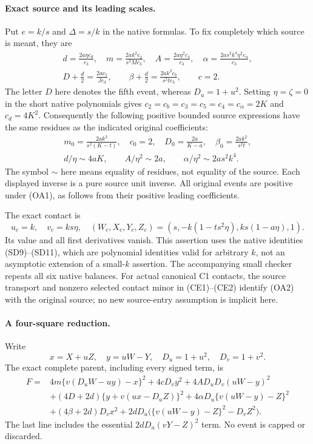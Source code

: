 \paragraph{Exact source and its leading scales.}
Put $e=k/s$ and $\Delta=s/k$ in the native formulas. To fix completely
which source is meant, they are
\[
\begin{gathered}
 d=\frac{2a\eta c_d}{c_3},\quad
 m=\frac{2ak^2c_2}{s^2Mc_3},\quad
 A=\frac{2a\eta^2c_4}{c_3},\quad
 \alpha=\frac{2as^2k^4\eta^2c_\alpha}{c_3},\\
 D+\frac d2=\frac{2ac_5}{Jc_3},\qquad
 \beta+\frac d2=\frac{2ak^2c_b}{s^2tc_3},\qquad c=2.
\end{gathered}
\tag{OA2}
\]
The letter $D$ here denotes the fifth event, whereas $D_u=1+u^2$.
Setting $\eta=\zeta=0$ in the short native polynomials gives
$c_2=c_b=c_3=c_5=c_4=c_\alpha=2K$ and $c_d=4K^2$.
Consequently the following positive bounded source expressions have
the same residues as the indicated original coefficients:
\[
\begin{gathered}
 m_0=\frac{2ak^2}{s^2(K-t)},\quad
 c_0=2,\quad D_0=\frac{2a}{K-a},\quad
 \beta_0=\frac{2ak^2}{s^2t},\\
 d/\eta\sim4aK,\qquad A/\eta^2\sim2a,\qquad
 \alpha/\eta^2\sim2as^2k^4.                         
\end{gathered}
\tag{OA3}
\]
The symbol $\sim$ here means equality of residues, not equality of
the source. Each displayed inverse is a pure source unit inverse.
All original events are positive under (OA1), as follows from their
positive leading coefficients.

The exact contact is
\[
 u_c=k,\quad v_c=ks\eta,\quad
 (W_c,X_c,Y_c,Z_c)=(s,-k(1-ts^2\eta),ks(1-a\eta),1).
                                                        \tag{OA4}
\]
Its value and all first derivatives vanish. This assertion uses the
native identities (SD9)--(SD11), which are polynomial identities valid
for arbitrary $k$, not an asymptotic extension of a small-$k$ assertion.
The accompanying small checker repeats all six native balances.
For actual canonical C1 contacts, the source transport and nonzero
selected contact minor in (CE1)--(CE2) identify (OA2) with the original
source; no new source-entry assumption is implicit here.

\paragraph{A four-square reduction.}
Write
\[
 x=X+uZ,\quad y=uW-Y,\quad D_u=1+u^2,\quad D_v=1+v^2.
\]
The exact complete parent, including every signed term, is
\begin{align*}
 F={}&4m\{v(D_uW-uy)-x\}^2+4cD_vy^2
       +4AD_uD_v(uW-y)^2\\
 &+(4D+2d)\{y+v(ux-D_uZ)\}^2
       +4\alpha D_u\{v(uW-y)-Z\}^2\\
 &+(4\beta+2d)D_vx^2
       +2dD_u\bigl(\{v(uW-y)-Z\}^2-D_vZ^2\bigr).
                                                        \tag{OA5}
\end{align*}
The last line includes the essential $2dD_u(vY-Z)^2$ term.
No event is capped or discarded.

